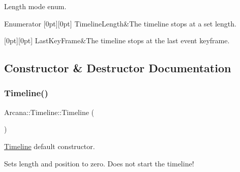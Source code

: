 Length mode enum. 

\begin{DoxyEnumFields}{Enumerator}
[0pt][0pt]{}\mbox{\label{class_arcana_1_1_timeline_ab4605d34e12005cf268ca146751f1eeda392c0af54c9f73e38d8e676605464110}} 
Timeline\+Length&The timeline stops at a set length. \\
\hline

[0pt][0pt]{}\mbox{\label{class_arcana_1_1_timeline_ab4605d34e12005cf268ca146751f1eedaad8bacad8edb62e39b9972fac10f2cba}} 
Last\+Key\+Frame&The timeline stops at the last event keyframe. \\
\hline

\end{DoxyEnumFields}


\subsection{Constructor \& Destructor Documentation}
\mbox{\label{class_arcana_1_1_timeline_a4a9b19ce9b7480a6816c0476b7fa2330}} 
\subsubsection{\texorpdfstring{Timeline()}{Timeline()}}
{\footnotesize\ttfamily Arcana\+::\+Timeline\+::\+Timeline (\begin{DoxyParamCaption}{ }\end{DoxyParamCaption})}



\mbox{\hyperlink{class_arcana_1_1_timeline}{Timeline}} default constructor. 

Sets length and position to zero. Does not start the timeline! 

